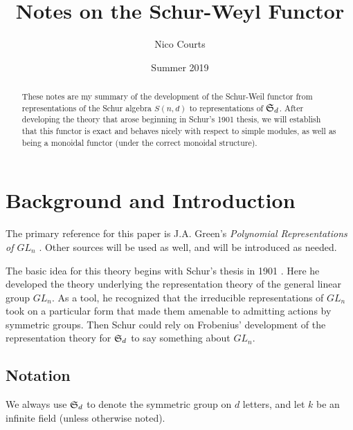 \documentclass[12pt]{article}
\DeclareMathOperator{\1}{\mathbbm{1}}
\begin{document}
\title{Notes on the Schur-Weyl Functor \vspace{-1ex}}
\author{Nico Courts}
\date{Summer 2019}
\maketitle

\begin{abstract}
	These notes are my summary of the development of the Schur-Weil functor from representations of the Schur algebra $S(n,d)$ to 
	representations of $\mathfrak{S}_d$. After developing the theory that arose beginning in Schur's 1901 thesis, we will establish that this 
	functor is exact and behaves nicely with respect to simple modules, as well as being a monoidal functor (under the correct monoidal structure).
\end{abstract}

\section{Background and Introduction}
The primary reference for this paper is J.A. Green's \textit{Polynomial Representations of $GL_n$} \cite{green}. Other sources will be used as well, 
and will be introduced as needed.

The basic idea for this theory begins with Schur's thesis in 1901 \cite{schur-thesis}. Here he developed the theory underlying
the representation theory of the general linear group $GL_n$. As a tool, he recognized that the irreducible representations of 
$GL_n$ took on a particular form that made them amenable to admitting actions by symmetric groups. Then Schur could rely on 
Frobenius' development of the representation theory for $\mathfrak{S}_d$ to say something about $GL_n$.

\subsection{Notation}
We always use $\mathfrak{S}_d$ to denote the symmetric group on $d$ letters, and let $k$ be an infinite field (unless otherwise noted).
\end{document}
